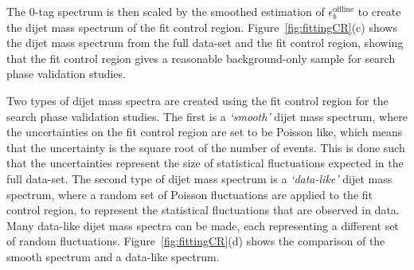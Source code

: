 The 0-tag spectrum is then scaled by the smoothed estimation of $\epsilon_b^{\text{offline}}$ to create the dijet mass spectrum of the fit control region.
Figure~\ref{fig:fittingCR}(c) shows the dijet mass spectrum from the full \lm{} data-set and the fit control region,
showing that the fit control region gives a reasonable background-only sample for search phase validation studies.

Two types of dijet mass spectra are created using the fit control region for the search phase validation studies.
The first is a \textit{`smooth'} dijet mass spectrum, where the uncertainties on the fit control region are set to be Poisson like,
which means that the uncertainty is the square root of the number of events.
This is done such that the uncertainties represent the size of statistical fluctuations expected in the full \lm{} data-set.
The second type of dijet mass spectrum is a \textit{`data-like'} dijet mass spectrum,
where a random set of Poisson fluctuations are applied to the fit control region,
to represent the statistical fluctuations that are observed in data.
Many data-like dijet mass spectra can be made, each representing a different set of random fluctuations.
Figure~\ref{fig:fittingCR}(d) shows the comparison of the smooth spectrum and a data-like spectrum.

